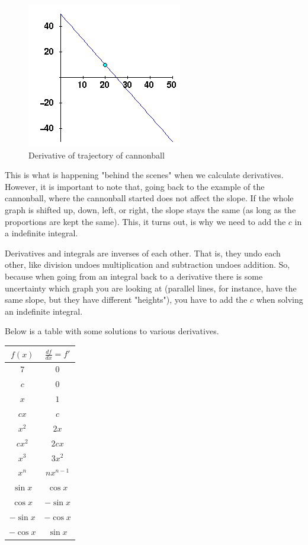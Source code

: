\begin{figure}[H]
\caption{Derivative of trajectory of cannonball}
\includegraphics[scale=0.8]{derivative.png}
\end{figure}

This is what is happening "behind the scenes" when we calculate derivatives.
However, it is important to note that, going back to the example of the cannonball, where the cannonball started does not affect the slope. 
If the whole graph is shifted up, down, left, or right, the slope stays the same (as long as the proportions are kept the same). 
This, it turns out, is why we need to add the $c$ in a indefinite integral. 

Derivatives and integrals are inverses of each other. 
That is, they undo each other, like division undoes multiplication and subtraction undoes addition. 
So, because when going from an integral back to a derivative there is some uncertainty which graph you are looking at (parallel lines, for instance, have the same slope, but they have different "heights"), you have to add the $c$ when solving an indefinite integral.

Below is a table with some solutions to various derivatives.

\begin{tabular}{c|c}
    $f(x)$ & $\frac{df}{dx} = f'$\\
    \hline
       $7$  & $0$ \\
        $c$ & $0$ \\
        $x$ & $1$ \\
        $cx$ & $c$ \\
        $x^2$ & $2x$ \\
        $cx^2$ & $2cx$ \\
        $x^3$ & $3x^2$ \\
        $x^n$ & $nx^{n-1}$ \\
        $\sin x$ & $\cos x$ \\
        $\cos x$ & $-\sin x$ \\
        $- \sin x$ & $- \cos x$ \\
        $-\cos x$ & $\sin x$
\end{tabular}

